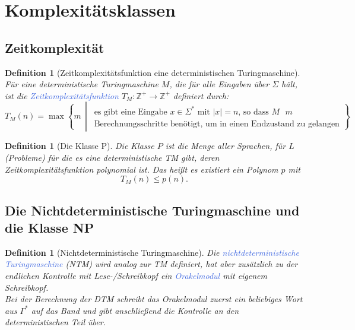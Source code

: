 \documentclass[11pt]{scrartcl}
\newcommand{\tcol}[1]{\textcolor{RoyalBlue}{#1}}
\newcommand{\set}[1]{\left\lbrace #1\right\rbrace}
\theoremstyle{break}
\newtheorem{defi}[satz]{Definition}
\begin{document}
    \section{Komplexitätsklassen}
	\label{sec:komplexitätsklassenindex}


    \subsection{Zeitkomplexität}
	\label{subsec:zeitkomplexität}

    \begin{defi}[Zeitkomplexitätsfunktion eine deterministischen Turingmaschine]
        Für eine deterministische Turingmaschine $M$, die für alle Eingaben über $\Sigma$ hält, ist die \tcol{Zeitkomplexitätsfunktion} $T_M\colon\mathbb{Z}^+\to\mathbb{Z}^+$ definiert durch:
        \[
            T_M(n)=\max\set{m\,\middle|\,
            \begin{array}{c}
                \text{es gibt eine Eingabe $x\in\Sigma^*$ mit $|x|=n$, so dass $M$ $m$}\\
                \text{Berechnungsschritte benötigt, um in einen Endzustand zu gelangen}
            \end{array}}
        \]
    \end{defi}

    \begin{defi}[Die Klasse P]
        Die Klasse $P$ ist die Menge aller Sprachen, für $L$ (Probleme) für die es eine deterministische TM gibt, deren Zeitkomplexitätsfunktion polynomial ist.
        Das heißt es existiert ein Polynom $p$ mit\[T_M(n)\leq p(n).\]
    \end{defi}


    \subsection{Die Nichtdeterministische Turingmaschine und die Klasse NP}
	\label{subsec:die-nichtdeterministische-turingmaschineindexund-die-klasse-npindex}

    \begin{defi}[Nichtdeterministische Turingmaschine]
        Die \tcol{nichtdeterministische Turingmaschine} (NTM) wird analog zur TM definiert, hat aber zusätzlich zu der endlichen Kontrolle mit Lese-/Schreibkopf ein \tcol{Orakelmodul} mit eigenem Schreibkopf.\\
        Bei der Berechnung der DTM schreibt das Orakelmodul zuerst ein beliebiges Wort aus $\Gamma^*$ auf das Band und gibt anschließend die Kontrolle an den deterministischen Teil über.
    \end{defi}
\end{document}
